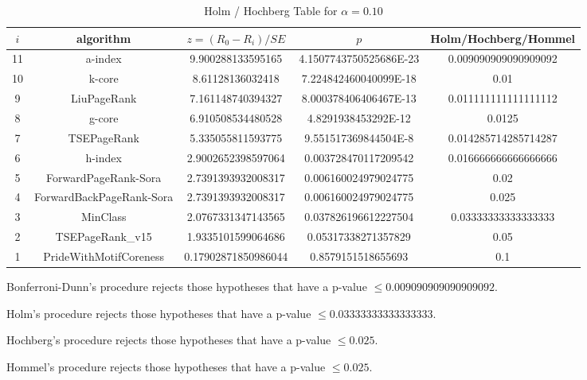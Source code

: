 \documentclass[a4paper,10pt]{article}
\begin{document}
\begin{landscape}
\begin{table}[!htp]
\centering\tiny
\caption{Holm / Hochberg Table for $\alpha=0.10$}
\begin{tabular}{ccccc}
$i$&algorithm&$z=(R_0 - R_i)/SE$&$p$&Holm/Hochberg/Hommel\\
\hline
11&a-index&9.900288133595165&4.1507743750525686E-23&0.009090909090909092\\
10&k-core&8.61128136032418&7.224842460040099E-18&0.01\\
9&LiuPageRank&7.161148740394327&8.000378406406467E-13&0.011111111111111112\\
8&g-core&6.910508534480528&4.8291938453292E-12&0.0125\\
7&TSEPageRank&5.335055811593775&9.551517369844504E-8&0.014285714285714287\\
6&h-index&2.9002652398597064&0.003728470117209542&0.016666666666666666\\
5&ForwardPageRank-Sora&2.7391393932008317&0.006160024979024775&0.02\\
4&ForwardBackPageRank-Sora&2.7391393932008317&0.006160024979024775&0.025\\
3&MinClass&2.0767331347143565&0.037826196612227504&0.03333333333333333\\
2&TSEPageRank_v15&1.9335101599064686&0.05317338271357829&0.05\\
1&PrideWithMotifCoreness&0.17902871850986044&0.8579151518655693&0.1\\
\hline
\end{tabular}
\end{table}
Bonferroni-Dunn's procedure rejects those hypotheses that have a p-value $\le0.009090909090909092$.


Holm's procedure rejects those hypotheses that have a p-value $\le0.03333333333333333$.


Hochberg's procedure rejects those hypotheses that have a p-value $\le0.025$.


Hommel's procedure rejects those hypotheses that have a p-value $\le0.025$.



\end{landscape}
\end{document}
